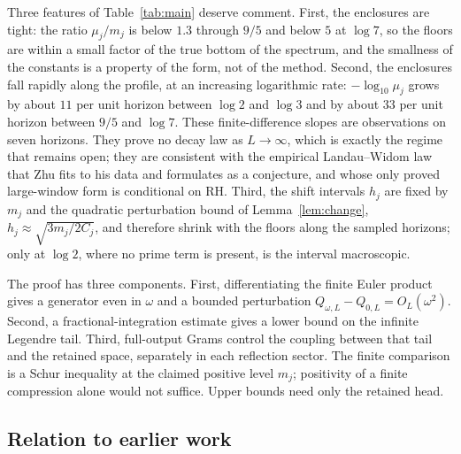 \documentclass[11pt]{article}
\numberwithin{equation}{section}
\theoremstyle{definition}
\theoremstyle{remark}
\begin{document}
Three features of Table~\ref{tab:main} deserve comment. First, the enclosures
are tight: the ratio $\mu_j/m_j$ is below $1.3$ through $9/5$ and below $5$ at
$\log7$, so the floors are within a small factor of the true bottom of the
spectrum, and the smallness of the constants is a property of the form, not of
the method. Second, the enclosures fall rapidly along the profile, at an
increasing logarithmic rate: $-\log_{10}\mu_j$ grows by about $11$ per unit
horizon between $\log2$ and $\log3$ and by about $33$ per unit horizon between
$9/5$ and $\log7$. These finite-difference slopes are observations on seven
horizons. They prove no decay law as $L\to\infty$, which is exactly the regime
that remains open; they are consistent with the empirical Landau--Widom law
that Zhu \cite{Zhu2026} fits to his data and formulates as a conjecture, and
whose only proved large-window form is conditional on RH. Third, the shift
intervals $h_j$ are fixed by $m_j$ and the quadratic perturbation bound of
Lemma~\ref{lem:change}, $h_j\approx\sqrt{3m_j/2C_j}$, and therefore shrink
with the floors along the sampled horizons; only at $\log2$, where no prime
term is present, is the interval macroscopic.

The proof has three components. First, differentiating the finite Euler
product gives a generator even in $\omega$ and a bounded perturbation
$Q_{\omega,L}-Q_{0,L}=O_L(\omega^2)$. Second, a fractional-integration estimate
gives a lower bound on the infinite Legendre tail. Third, full-output Grams
control the coupling between that tail and the retained space, separately in
each reflection sector. The finite comparison is a Schur inequality at the
claimed positive level $m_j$; positivity of a finite compression alone
would not suffice. Upper bounds need only the retained head.

\subsection{Relation to earlier work}
\end{document}
